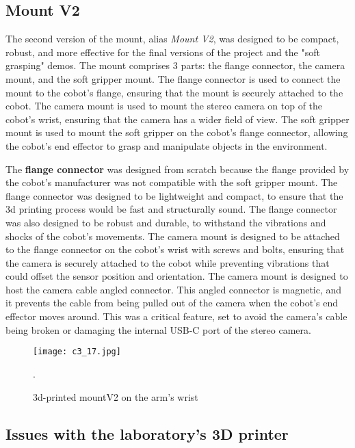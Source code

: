 \subsection{Mount V2}


The second version of the mount, alias \textit{Mount V2}, was designed to be compact, robust, and more effective
for the final versions of the project and the "soft grasping" demos. The mount comprises 3 parts:
the flange connector, the camera mount, and the soft gripper mount. The flange connector is used to connect
the mount to the cobot's flange, ensuring that the mount is securely attached to the cobot. The camera mount
is used to mount the stereo camera on top of the cobot's wrist, ensuring that the camera has a wider field of view.
The soft gripper mount is used to mount the soft gripper on the cobot's flange connector, allowing the cobot's
end effector to grasp and manipulate objects in the environment.

The \textbf{flange connector} was designed from scratch because the flange provided by the cobot's manufacturer was not
compatible with the soft gripper mount. The flange connector was designed to be lightweight and compact, 
to ensure that the 3d printing process would be fast and structurally sound. The flange connector was also designed
to be robust and durable, to withstand the vibrations and shocks of the cobot's movements.
The camera mount is designed to be attached to the flange connector on the cobot's wrist with screws and bolts,
ensuring that the camera is securely attached to the cobot while preventing vibrations that could
offset the sensor position and orientation. The camera mount is designed to host the camera cable angled connector.
This angled connector is magnetic, and it prevents the cable from being pulled out of the camera when
the cobot's end effector moves around. This was a critical feature, set to avoid the camera's cable
being broken or damaging the internal USB-C port of the stereo camera.

\begin{figure}[t]
    \centering
    \texttt{[image: c3\_17.jpg]}
    \captionsetup{width=1\linewidth}
    \caption{3d-printed mountV2 on the arm's wrist}.
    \label{fig:c3_img17}
\end{figure}

\subsection{Issues with the laboratory's 3D printer}

